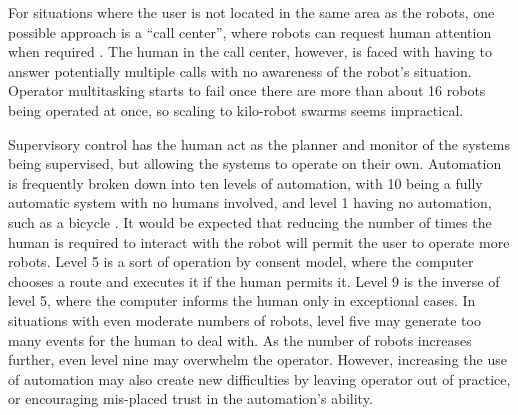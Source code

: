 \documentclass[]{article}
\begin{document}


For situations where the user is not located in the same area as the robots, one possible approach is a ``call center'', where robots can request human attention when required \cite{chen2011supervisory}. The human in the call center, however, is faced with having to answer potentially multiple calls with no awareness of the robot's situation. Operator multitasking starts to fail once there are more than about 16 robots being operated at once, so scaling to kilo-robot swarms seems impractical.  

Supervisory control has the human act as the planner and monitor of the systems being supervised, but allowing the systems to operate on their own.
Automation is frequently broken down into ten levels of automation, with 10 being a fully automatic system with no humans involved, and level 1 having no automation, such as a bicycle \cite{parasuraman2000model}. 
It would be expected that reducing the number of times the human is required to interact with the robot will permit the user to operate more robots. 
Level 5 is a sort of operation by consent model, where the computer chooses a route and executes it if the human permits it. 
Level 9 is the inverse of level 5, where the computer informs the human only in exceptional cases. 
In situations with even moderate numbers of robots, level five may generate too many events for the human to deal with. 
As the number of robots increases further, even level nine may overwhelm the operator. 
However, increasing the use of automation may also create new difficulties by leaving operator out of practice, or encouraging mis-placed trust in the automation's ability. 
\end{document}
